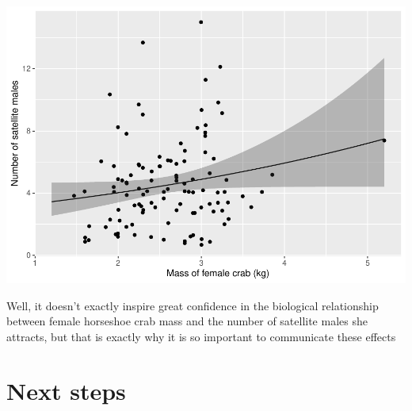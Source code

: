 \documentclass[
]{book}
\newenvironment{Shaded}{\begin{snugshade}}{\end{snugshade}}
\newcommand{\DataTypeTok}[1]{\textcolor[rgb]{0.13,0.29,0.53}{#1}}
\newcommand{\DecValTok}[1]{\textcolor[rgb]{0.00,0.00,0.81}{#1}}
\newcommand{\FloatTok}[1]{\textcolor[rgb]{0.00,0.00,0.81}{#1}}
\newcommand{\KeywordTok}[1]{\textcolor[rgb]{0.13,0.29,0.53}{\textbf{#1}}}
\newcommand{\NormalTok}[1]{#1}
\newcommand{\OperatorTok}[1]{\textcolor[rgb]{0.81,0.36,0.00}{\textbf{#1}}}
\newcommand{\OtherTok}[1]{\textcolor[rgb]{0.56,0.35,0.01}{#1}}
\newcommand{\StringTok}[1]{\textcolor[rgb]{0.31,0.60,0.02}{#1}}
\begin{document}
\begin{Shaded}
\end{Shaded}

\includegraphics{worstr_files/figure-latex/unnamed-chunk-366-1.pdf}

Well, it doesn't exactly inspire great confidence in the biological relationship between female horseshoe crab mass and the number of satellite males she attracts, but that is exactly why it is so important to communicate these effects

\hypertarget{next-steps}{%
\section{Next steps}\label{next-steps}}
\end{document}
